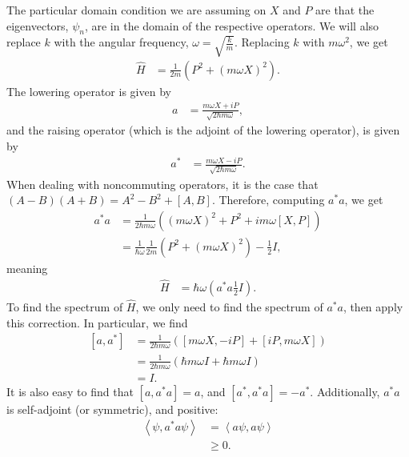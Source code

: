 \documentclass[12pt]{extarticle}
\newcommand{\iprod}[2]{\left\langle #1,#2\right\rangle}
\theoremstyle{plain}
\theoremstyle{definition}
\theoremstyle{remark}
\begin{document}
  The particular domain condition we are assuming on $X$ and $P$ are that the eigenvectors, $\psi_n$, are in the domain of the respective operators. We will also replace $k$ with the angular frequency, $\omega = \sqrt{\frac{k}{m}}$. Replacing $k$ with $m\omega^2$, we get
  \begin{align*}
    \hat{H} &= \frac{1}{2m}\left(P^2 + \left(m\omega X\right)^2\right).
  \end{align*}
  The lowering operator is given by
  \begin{align*}
    a &= \frac{m\omega X + iP}{\sqrt{2\hbar m \omega}},
  \end{align*}
  and the raising operator (which is the adjoint of the lowering operator), is given by
  \begin{align*}
    a^{\ast} &= \frac{m\omega X - iP}{\sqrt{2\hbar m \omega}}.
  \end{align*}
  When dealing with noncommuting operators, it is the case that $(A-B)(A+B) = A^2 - B^2 + [A,B]$. Therefore, computing $a^{\ast} a$, we get
  \begin{align*}
    a^{\ast}a &= \frac{1}{2\hbar m \omega} \left(\left(m\omega X\right)^2 + P^2 + im\omega[X,P]\right)\\
              &= \frac{1}{\hbar\omega}\frac{1}{2m}\left(P^2 + \left(m\omega X\right)^2\right) - \frac{1}{2}I,
  \end{align*}
  meaning
  \begin{align*}
    \hat{H} &= \hbar\omega \left(a^{\ast}a \frac{1}{2}I\right).
  \end{align*}
  To find the spectrum of $\hat{H}$, we only need to find the spectrum of $a^{\ast}a$, then apply this correction. In particular, we find
  \begin{align*}
    \left[a,a^{\ast}\right] &= \frac{1}{2\hbar m \omega}\left([m\omega X,-iP] + [iP,m\omega X]\right)\\
                            &= \frac{1}{2\hbar m \omega}\left(\hbar m \omega I + \hbar m \omega I\right)\\
                            &= I.
  \end{align*}
  It is also easy to find that $\left[a,a^{\ast}a\right] = a$, and $\left[a^{\ast},a^{\ast}a\right] = -a^{\ast}$. Additionally, $a^{\ast}a$ is self-adjoint (or symmetric), and positive:
  \begin{align*}
    \iprod{\psi}{a^{\ast}a\psi} &= \iprod{a\psi}{a\psi}\\
                                &\geq 0.
  \end{align*}
\end{document}
